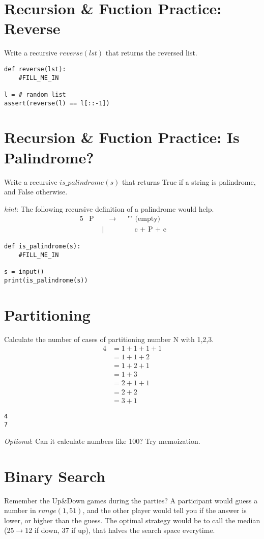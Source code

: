 \documentclass{article}
\begin{document}
\section{Recursion \& Fuction Practice: Reverse}
Write a recursive $reverse(lst)$ that returns the reversed list.
\begin{lstlisting}
def reverse(lst):
    #FILL_ME_IN

l = # random list
assert(reverse(l) == l[::-1])
\end{lstlisting}

\section{Recursion \& Fuction Practice: Is Palindrome?}
Write a recursive $is\_palindrome(s)$ that returns True if a string is
palindrome, and False otherwise.

\textit{hint}: The following recursive definition of a palindrome would help.
\begin{alignat*}{5}
  &\text{P}&\quad\rightarrow&&\text{"" (empty)}\\
  &\quad&\mid\ &&\quad\text{c + P + c}\quad&&
\end{alignat*}
\begin{lstlisting}
def is_palindrome(s):
    #FILL_ME_IN

s = input()
print(is_palindrome(s))
\end{lstlisting}

\section{Partitioning}
  Calculate the number of cases of partitioning number N with 1,2,3.\\
  \begin{align*}
  4 &= 1+1+1+1\\
    &= 1+1+2\\
    &= 1+2+1\\
    &= 1+3\\
    &= 2+1+1\\
    &= 2+2\\
    &= 3+1
  \end{align*}
\begin{lstlisting}
4
7
\end{lstlisting}
\textit{Optional}: Can it calculate numbers like 100? Try memoization.

\section{Binary Search}
Remember the Up\&Down games during the parties?
A participant would guess a number in $range(1, 51)$, and the other player
would tell you if the answer is lower, or higher than the guess.
The optimal strategy would be to call the median (25$\rightarrow$12 if down, 37
if up), that halves
the search space everytime.
\end{document}
